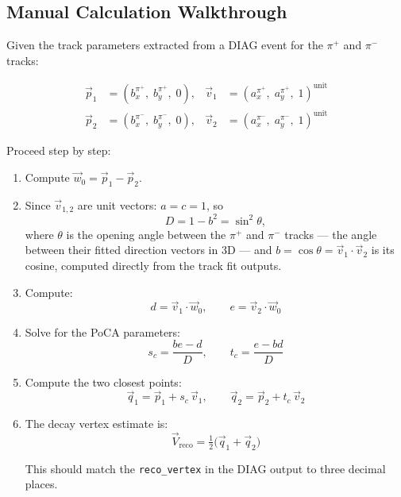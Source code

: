 \subsection{Manual Calculation Walkthrough}

Given the track parameters extracted from a DIAG event for the $\pi^+$ and
$\pi^-$ tracks:

\begin{align}
    \vec{p}_{1} &= (b_x^{\pi^+},\; b_y^{\pi^+},\; 0), &
    \vec{v}_{1} &= (a_x^{\pi^+},\; a_y^{\pi^+},\; 1)^{\text{unit}} \\
    \vec{p}_{2} &= (b_x^{\pi^-},\; b_y^{\pi^-},\; 0), &
    \vec{v}_{2} &= (a_x^{\pi^-},\; a_y^{\pi^-},\; 1)^{\text{unit}}
\end{align}

Proceed step by step:

\begin{enumerate}
    \item Compute $\vec{w}_0 = \vec{p}_1 - \vec{p}_2$.

    \item Since $\vec{v}_{1,2}$ are unit vectors: $a = c = 1$, so
    \begin{equation}
        D = 1 - b^2 = \sin^2\theta,
    \end{equation}
    where $\theta$ is the opening angle between the $\pi^+$ and $\pi^-$ tracks --- the angle between their fitted direction vectors in 3D --- and $b = \cos\theta = \vec{v}_1 \cdot \vec{v}_2$ is its cosine, computed directly from the track fit outputs.

    \item Compute:
    \begin{equation}
        d = \vec{v}_1 \cdot \vec{w}_0, \qquad e = \vec{v}_2 \cdot \vec{w}_0
    \end{equation}

    \item Solve for the PoCA parameters:
    \begin{equation}
        s_c = \frac{be - d}{D}, \qquad t_c = \frac{e - bd}{D}
    \end{equation}

    \item Compute the two closest points:
    \begin{equation}
        \vec{q}_1 = \vec{p}_1 + s_c\,\vec{v}_1, \qquad
        \vec{q}_2 = \vec{p}_2 + t_c\,\vec{v}_2
    \end{equation}

    \item The decay vertex estimate is:
    \begin{equation}
        \vec{V}_\text{reco} = \tfrac{1}{2}\bigl(\vec{q}_1 + \vec{q}_2\bigr)
    \end{equation}

    This should match the \texttt{reco\_vertex} in the DIAG output to three
    decimal places.
\end{enumerate}

